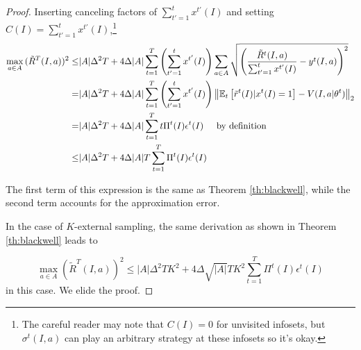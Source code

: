 \documentclass{article}
\begin{document}
\begin{proof}
\newcommand{\sumxt}{\sum_{t'=1}^t x^{t'}(I)}


Inserting canceling factors of $\sumxt$ and setting $C(I) = \sumxt$,\footnote{The careful reader may note that $C(I)=0$ for unvisited infosets, but $\sigma^t(I,a)$ can play an arbitrary strategy at these infosets so it's okay.}
  \begin{align}
    \max_{a\in A} {(\tilde{R}^T(I, a))^2} \leq & |A| \Delta^2 T + 4 \Delta |A| \sum_{t=1}^T {\left( \sumxt \right) \sum_{a\in A} \sqrt{ \left( \frac{\tilde{R}^t(I,a)}{\sumxt} - y^t(I,a)\right)^2 }} \\
   = & |A| \Delta^2 T + 4 \Delta |A| \sum_{t=1}^T {\left( \sumxt \right) \norm{ \mathbb{E}_t \left[ \tilde{r}^t(I) | x^t(I) = 1 \right] - V(I,a|\theta^t) }_2}  \\
    = & |A| \Delta^2 T + 4 \Delta |A| \sum_{t=1}^T {t \Pi^t(I) \epsilon^t(I) } \hspace{0.5cm} \textrm{by definition}\\
    \leq & |A| \Delta^2 T + 4 \Delta |A| T \sum_{t=1}^T {\Pi^t(I) \epsilon^t(I) }\\
\end{align}


The first term of this expression is the same as Theorem \ref{th:blackwell}, while the second term accounts for the approximation error.

In the case of $K$-external sampling, the same derivation as shown in Theorem \ref{th:blackwell} leads to 

\begin{equation}
\label{th:approx_kes}
\max_{a\in A} {(\tilde{R}^T(I, a))^2} \leq |A| \Delta^2 T K^2 + 4 \Delta \sqrt{|A|} T K^2 \sum_{t=1}^T {\Pi^t(I) \epsilon^t(I) }
\end{equation}
in this case. We elide the proof.


\end{proof}
\end{document}
